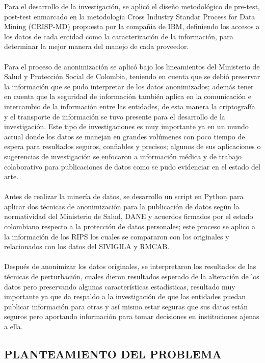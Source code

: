\documentclass[a4paper,openright,12pt]{book}
\theoremstyle{definition}
\theoremstyle{remark}
\begin{document}
Para el desarrollo de la investigación, se aplicó el diseño metodológico de pre-test, post-test enmarcado en la metodología Cross Industry Standar Process for Data Mining (CRISP-MD) propuesta por la compañia de IBM, definiendo los accesos a los datos de cada entidad como la caracterización de la información, para determinar la mejor manera del manejo de cada proveedor.\\\\Para el proceso de anonimización se aplicó bajo los lineamientos del Ministerio de Salud y Protección Social de Colombia, teniendo en cuenta que se debió preservar la información que se pudo interpretar de los datos anonimizados; además tener en cuenta que la seguridad de información también aplica en la comunicación e intercambio de la información entre las entidades, de esta manera la criptografía y el transporte de información se tuvo presente para el desarrollo de la investigación. Este tipo de investigaciones es muy importante ya en un mundo actual donde los datos se manejan en grandes volúmenes con poco tiempo de espera para resultados seguros, confiables y precisos; algunos de sus aplicaciones o sugerencias de investigación se enfocaron a información médica y de trabajo colaborativo para publicaciones de datos como se pudo evidenciar en el estado del arte.\\\\ Antes de realizar la minería de datos, se desarrollo un script en Python para aplicar dos técnicas de anonimización para la publicación de datos según la normatividad del Ministerio de Salud, DANE y acuerdos firmados por el estado colombiano respecto a la protección de datos personales; este proceso se aplico a la información de los RIPS los cuales se compararon con los originales y relacionados con los datos del SIVIGILA y RMCAB.\\\\Después de anonimizar los datos originales, se interpretaron los resultados de las técnicas de perturbación, cuales dieron resultados esperado de la alteración de los datos pero preservando algunas características estadísticas, resultado muy importante ya que da respaldo a la investigación de que las entidades puedan publicar información para otras y así mismo estar seguras que sus datos están seguros pero aportando información para tomar decisiones en instituciones ajenas a ella.
\begin{center}
 \chapter{PLANTEAMIENTO DEL PROBLEMA}\label{cap.planteamiento}
 \end{center}
 
\end{document}
